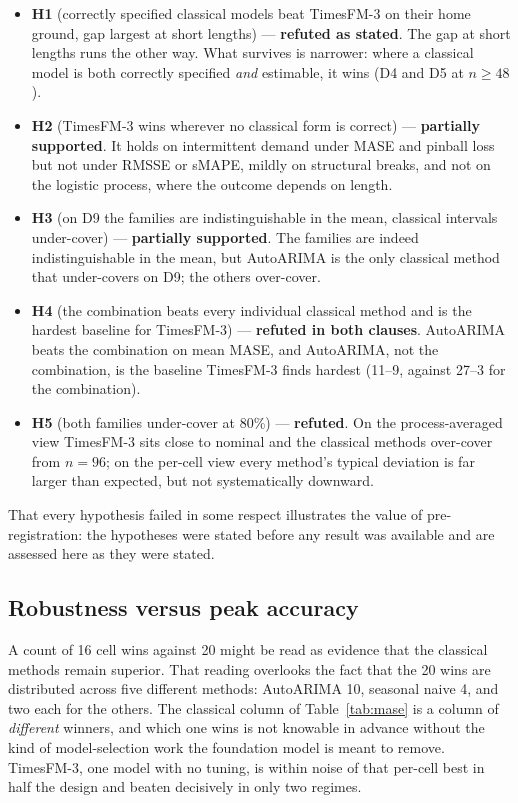 \documentclass[article]{ajs}
\providecommand{\tableref}[1]{Table~\ref{#1}}
\begin{document}
\begin{itemize}
\item \textbf{H1} (correctly specified classical models beat TimesFM-3 on their home ground,
      gap largest at short lengths) --- \textbf{refuted as stated}. The gap at short lengths runs
      the other way. What survives is narrower: where a classical model is both correctly
      specified \emph{and} estimable, it wins (D4 and D5 at $n \geq 48$).
\item \textbf{H2} (TimesFM-3 wins wherever no classical form is correct) ---
      \textbf{partially supported}. It holds on intermittent demand under MASE and pinball loss
      but not under RMSSE or sMAPE, mildly on structural breaks, and not on the logistic process,
      where the outcome depends on length.
\item \textbf{H3} (on D9 the families are indistinguishable in the mean, classical intervals
      under-cover) --- \textbf{partially supported}. The families are indeed indistinguishable in
      the mean, but AutoARIMA is the only classical method that under-covers on D9; the others
      over-cover.
\item \textbf{H4} (the combination beats every individual classical method and is the hardest
      baseline for TimesFM-3) --- \textbf{refuted in both clauses}. AutoARIMA beats the
      combination on mean MASE, and AutoARIMA, not the combination, is the baseline TimesFM-3
      finds hardest (11--9, against 27--3 for the combination).
\item \textbf{H5} (both families under-cover at 80\%) --- \textbf{refuted}. On the
      process-averaged view TimesFM-3 sits close to nominal and the classical methods over-cover
      from $n = 96$; on the per-cell view every method's typical deviation is far larger
      than expected, but not systematically downward.
\end{itemize}

That every hypothesis failed in some respect illustrates the value of pre-registration: the
hypotheses were stated before any result was available and are assessed here as they were stated.

\subsection{Robustness versus peak accuracy}
\label{sec:tradeoff}

A count of 16 cell wins against 20 might be read as evidence that the classical methods remain
superior. That reading overlooks the fact that the 20 wins are distributed across five different
methods: AutoARIMA 10, seasonal naive 4, and two each for the others. The classical column of
\tableref{tab:mase} is a column of \emph{different} winners, and which one wins is not knowable
in advance without the kind of model-selection work the foundation model is meant to remove.
TimesFM-3, one model with no tuning, is within noise of that per-cell best in half the design
and beaten decisively in only two regimes.
\end{document}
